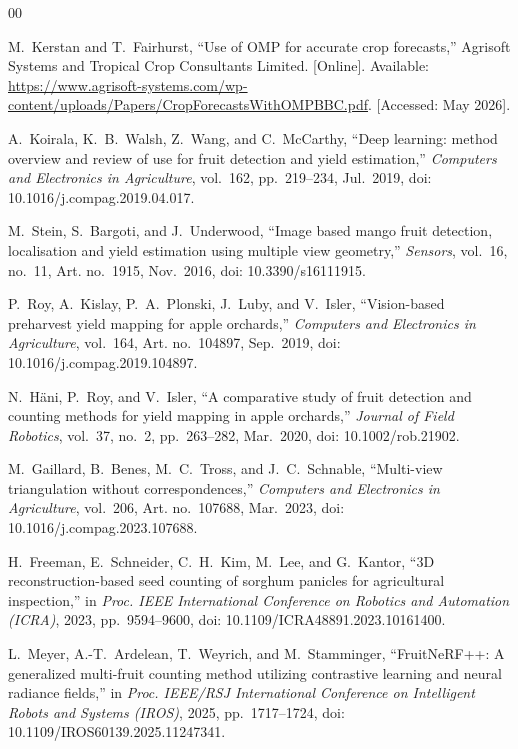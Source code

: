 \documentclass[conference,a4paper]{IEEEtran}
\begin{document}
\begin{thebibliography}{00}

M.~Kerstan and T.~Fairhurst,
``Use of OMP for accurate crop forecasts,''
Agrisoft Systems and Tropical Crop Consultants Limited. [Online]. Available:
\url{https://www.agrisoft-systems.com/wp-content/uploads/Papers/CropForecastsWithOMPBBC.pdf}.
[Accessed: May 2026].

A.~Koirala, K.~B.~Walsh, Z.~Wang, and C.~McCarthy,
``Deep learning: method overview and review of use for fruit detection and
yield estimation,''
\textit{Computers and Electronics in Agriculture}, vol.~162, pp.~219--234,
Jul.~2019, doi: 10.1016/j.compag.2019.04.017.

M.~Stein, S.~Bargoti, and J.~Underwood,
``Image based mango fruit detection, localisation and yield estimation using
multiple view geometry,''
\textit{Sensors}, vol.~16, no.~11, Art. no.~1915, Nov.~2016,
doi: 10.3390/s16111915.

P.~Roy, A.~Kislay, P.~A.~Plonski, J.~Luby, and V.~Isler,
``Vision-based preharvest yield mapping for apple orchards,''
\textit{Computers and Electronics in Agriculture}, vol.~164, Art. no.~104897,
Sep.~2019, doi: 10.1016/j.compag.2019.104897.

N.~H\"{a}ni, P.~Roy, and V.~Isler,
``A comparative study of fruit detection and counting methods for yield
mapping in apple orchards,''
\textit{Journal of Field Robotics}, vol.~37, no.~2, pp.~263--282, Mar.~2020,
doi: 10.1002/rob.21902.

M.~Gaillard, B.~Benes, M.~C.~Tross, and J.~C.~Schnable,
``Multi-view triangulation without correspondences,''
\textit{Computers and Electronics in Agriculture}, vol.~206, Art. no.~107688,
Mar.~2023, doi: 10.1016/j.compag.2023.107688.

H.~Freeman, E.~Schneider, C.~H.~Kim, M.~Lee, and G.~Kantor,
``3D reconstruction-based seed counting of sorghum panicles for agricultural
inspection,''
in \textit{Proc. IEEE International Conference on Robotics and Automation
(ICRA)}, 2023, pp.~9594--9600, doi: 10.1109/ICRA48891.2023.10161400.

L.~Meyer, A.-T.~Ardelean, T.~Weyrich, and M.~Stamminger,
``FruitNeRF++: A generalized multi-fruit counting method utilizing contrastive
learning and neural radiance fields,''
in \textit{Proc. IEEE/RSJ International Conference on Intelligent Robots and
Systems (IROS)}, 2025, pp.~1717--1724, doi: 10.1109/IROS60139.2025.11247341.


\end{thebibliography}
\end{document}
